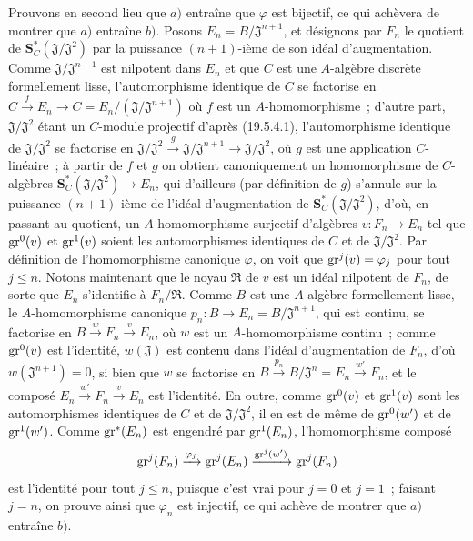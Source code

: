 \begin{env}[19.5.4.2]
\label{0.19.5.4.2-fr}
Prouvons en second lieu que $a)$ entraîne que $\varphi$ est bijectif, ce qui
achèvera de montrer que $a)$ entraîne $b)$. Posons
$E_n=B/\mathfrak J^{n+1}$, et désignons par $F_n$ le quotient de
$\mathbf S_C^*(\mathfrak J/\mathfrak J^2)$ par la puissance $(n+1)$-ième de
son idéal d'augmentation. Comme $\mathfrak J/\mathfrak J^{n+1}$ est nilpotent
dans $E_n$ et que $C$ est une $A$-algèbre discrète formellement lisse,
l'automorphisme identique de $C$ se factorise en
$C\xrightarrow{f}E_n\to C=E_n/(\mathfrak J/\mathfrak J^{n+1})$ où $f$ est un
$A$-homomorphisme~; d'autre part, $\mathfrak J/\mathfrak J^2$ étant un
$C$-module projectif d'après (19.5.4.1), l'automorphisme identique de
$\mathfrak J/\mathfrak J^2$ se factorise en
$\mathfrak J/\mathfrak J^2\xrightarrow{g}\mathfrak J/\mathfrak J^{n+1}
\to\mathfrak J/\mathfrak J^2$, où $g$ est une application $C$-linéaire~; à
partir de $f$ et $g$ on obtient canoniquement un homomorphisme de $C$-algèbres
$\mathbf S_C^*(\mathfrak J/\mathfrak J^2)\to E_n$, qui d'ailleurs (par
définition de $g$) s'annule sur la puissance $(n+1)$-ième de l'idéal
d'augmentation de $\mathbf S_C^*(\mathfrak J/\mathfrak J^2)$, d'où, en
passant au quotient, un $A$-homomorphisme surjectif d'algèbres
$v:F_n\to E_n$ tel que $\operatorname{gr}^0(v)$ et $\operatorname{gr}^1(v)$ soient les automorphismes
identiques de $C$ et de $\mathfrak J/\mathfrak J^2$. Par définition de
l'homomorphisme canonique $\varphi$, on voit que $\operatorname{gr}^j(v)=\varphi_j$ pour tout
$j\leq n$. Notons maintenant que le noyau $\mathfrak R$ de $v$ est un idéal
nilpotent de $F_n$, de sorte que $E_n$ s'identifie à $F_n/\mathfrak R$. Comme
$B$ est une $A$-algèbre formellement lisse, le $A$-homomorphisme canonique
$p_n:B\to E_n=B/\mathfrak J^{n+1}$, qui est continu, se factorise en
$B\xrightarrow{w}F_n\xrightarrow{v}E_n$, où $w$ est un $A$-homomorphisme
continu~; comme $\operatorname{gr}^0(v)$ est l'identité, $w(\mathfrak J)$ est contenu dans
l'idéal d'augmentation de $F_n$, d'où $w(\mathfrak J^{n+1})=0$, si bien que
$w$ se factorise en
$B\xrightarrow{p_n}B/\mathfrak J^n=E_n\xrightarrow{w'}F_n$, et le composé
$E_n\xrightarrow{w'}F_n\xrightarrow{v}E_n$ est l'identité. En outre, comme
$\operatorname{gr}^0(v)$ et $\operatorname{gr}^1(v)$ sont les automorphismes identiques de $C$ et de
$\mathfrak J/\mathfrak J^2$, il en est de même de $\operatorname{gr}^0(w')$ et de
$\operatorname{gr}^1(w')$. Comme $\operatorname{gr}^*(E_n)$ est engendré par $\operatorname{gr}^1(E_n)$,
l'homomorphisme composé
\[
  \operatorname{gr}^j(F_n)\xrightarrow{\varphi_j}\operatorname{gr}^j(E_n)
  \xrightarrow{\operatorname{gr}^j(w')}\operatorname{gr}^j(F_n)
\]
est l'identité pour tout $j\leq n$, puisque c'est vrai pour $j=0$ et $j=1$~;
faisant $j=n$, on prouve ainsi que $\varphi_n$ est injectif, ce qui achève de
montrer que $a)$ entraîne $b)$.
\end{env}

